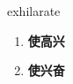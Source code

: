 
\begin{frame}
{\huge exhilarate}
\begin{center}
\begin{enumerate}\Large
  \item \textbf{使高兴}
  \item \textbf{使兴奋}
\end{enumerate}
\end{center}
\end{frame}
